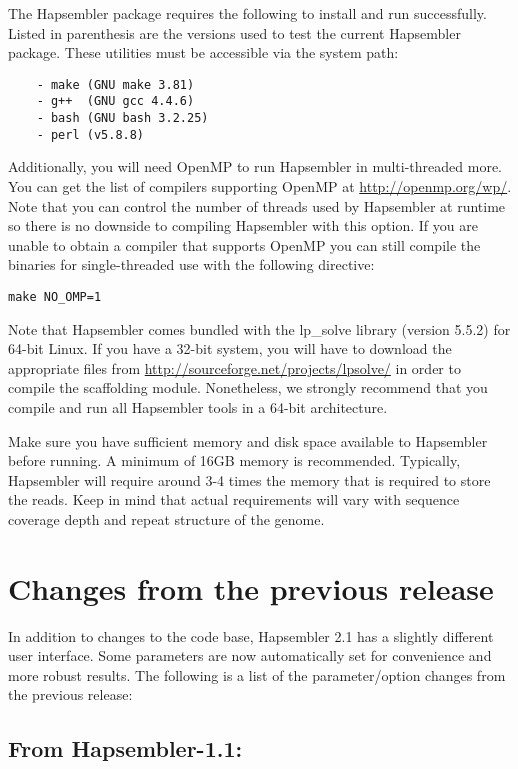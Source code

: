 \documentclass[12pt,a4paper]{report}
\newcommand{\hapversion}{2.1}
\begin{document}
The Hapsembler package requires the following to install and run successfully. Listed in parenthesis are the versions used to test the current Hapsembler package. These utilities must be accessible via the system path:

\begin{verbatim}
    - make (GNU make 3.81)
    - g++  (GNU gcc 4.4.6)
    - bash (GNU bash 3.2.25)
    - perl (v5.8.8)
\end{verbatim}

Additionally, you will need OpenMP to run Hapsembler in multi-threaded more. You can get the list of compilers supporting OpenMP at \url{http://openmp.org/wp/}. Note that you can control the number of threads used by Hapsembler at runtime so there is no downside to compiling Hapsembler with this option. If you are unable to obtain a compiler that supports OpenMP you can still compile the binaries for single-threaded use with the following directive:

\begin{verbatim}
make NO_OMP=1
\end{verbatim}

Note that Hapsembler comes bundled with the lp\_solve library (version 5.5.2) for 64-bit Linux. If you have a 32-bit system, you will have to download the appropriate files from \url{http://sourceforge.net/projects/lpsolve/} in order to compile the scaffolding module. Nonetheless, we strongly recommend that you compile and run all Hapsembler tools in a 64-bit architecture.

Make sure you have sufficient memory and disk space available to Hapsembler before running. A minimum of 16GB memory is recommended. Typically, Hapsembler will require around 3-4 times the memory that is required to store the reads. Keep in mind that actual requirements will vary with sequence coverage depth and repeat structure of the genome.

\section{Changes from the previous release}

In addition to changes to the code base, Hapsembler \hapversion{} has a slightly different user interface. Some parameters are now automatically set for convenience and more robust results. The following is a list of the parameter/option changes from the previous release:

\subsection{From Hapsembler-1.1:}
\end{document}

